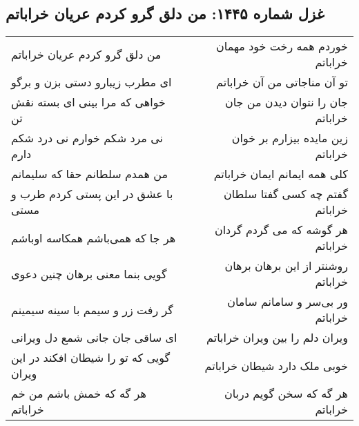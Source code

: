 \begin{center}
\section*{غزل شماره ۱۴۴۵: من دلق گرو کردم عریان خراباتم}
\label{sec:1445}
\begin{longtable}{l p{0.5cm} r}
من دلق گرو کردم عریان خراباتم
&&
خوردم همه رخت خود مهمان خراباتم
\\
ای مطرب زیبارو دستی بزن و برگو
&&
تو آن مناجاتی من آن خراباتم
\\
خواهی که مرا بینی ای بسته نقش تن
&&
جان را نتوان دیدن من جان خراباتم
\\
نی مرد شکم خوارم نی درد شکم دارم
&&
زین مایده بیزارم بر خوان خراباتم
\\
من همدم سلطانم حقا که سلیمانم
&&
کلی همه ایمانم ایمان خراباتم
\\
با عشق در این پستی کردم طرب و مستی
&&
گفتم چه کسی گفتا سلطان خراباتم
\\
هر جا که همی‌باشم همکاسه اوباشم
&&
هر گوشه که می گردم گردان خراباتم
\\
گویی بنما معنی برهان چنین دعوی
&&
روشنتر از این برهان برهان خراباتم
\\
گر رفت زر و سیمم با سینه سیمینم
&&
ور بی‌سر و سامانم سامان خراباتم
\\
ای ساقی جان جانی شمع دل ویرانی
&&
ویران دلم را بین ویران خراباتم
\\
گویی که تو را شیطان افکند در این ویران
&&
خوبی ملک دارد شیطان خراباتم
\\
هر گه که خمش باشم من خم خراباتم
&&
هر گه که سخن گویم دربان خراباتم
\\
\end{longtable}
\end{center}
